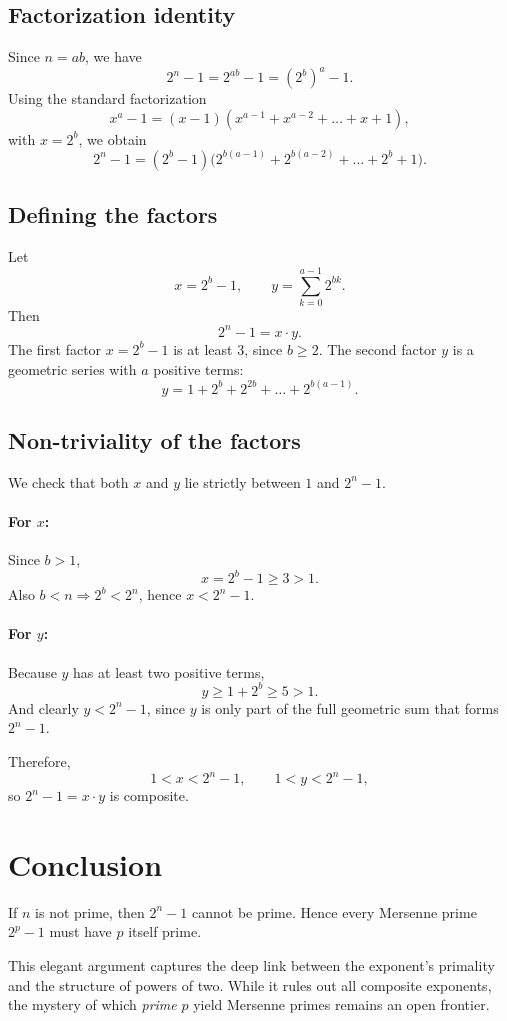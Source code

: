 \documentclass[11pt]{article}
\begin{document}
\subsection*{Factorization identity}

Since $n = a b$, we have
\[
2^n - 1 = 2^{a b} - 1 = (2^b)^a - 1.
\]
Using the standard factorization
\[
x^a - 1 = (x-1)(x^{a-1} + x^{a-2} + \dots + x + 1),
\]
with $x = 2^b$, we obtain
\[
2^n - 1 = (2^b - 1)\bigl(2^{b(a-1)} + 2^{b(a-2)} + \dots + 2^b + 1\bigr).
\]

\subsection*{Defining the factors}

Let
\[
x = 2^b - 1, \qquad
y = \sum_{k=0}^{a-1} 2^{b k}.
\]
Then
\[
2^n - 1 = x \cdot y.
\]
The first factor $x = 2^b - 1$ is at least $3$, since $b \ge 2$.  
The second factor $y$ is a geometric series with $a$ positive terms:
\[
y = 1 + 2^b + 2^{2b} + \dots + 2^{b(a-1)}.
\]

\subsection*{Non-triviality of the factors}

We check that both $x$ and $y$ lie strictly between $1$ and $2^n - 1$.

\paragraph{For $x$:}
Since $b>1$,
\[
x = 2^b - 1 \ge 3 > 1.
\]
Also $b < n \Rightarrow 2^b < 2^n$, hence $x < 2^n - 1$.

\paragraph{For $y$:}
Because $y$ has at least two positive terms,
\[
y \ge 1 + 2^b \ge 5 > 1.
\]
And clearly $y < 2^n - 1$, since $y$ is only part of the full geometric sum that forms $2^n - 1$.

Therefore,
\[
1 < x < 2^n - 1, \qquad 1 < y < 2^n - 1,
\]
so $2^n - 1 = x \cdot y$ is composite.

\section*{Conclusion}

\begin{tcolorbox}[colback=gray!5!white, colframe=black!40!gray]
If $n$ is not prime, then $2^n - 1$ cannot be prime.  
Hence every Mersenne prime $2^p - 1$ must have $p$ itself prime.
\end{tcolorbox}

\bigskip
\noindent
This elegant argument captures the deep link between the exponent's primality and the structure of powers of two. While it rules out all composite exponents, the mystery of which \emph{prime} $p$ yield Mersenne primes remains an open frontier.
\end{document}
